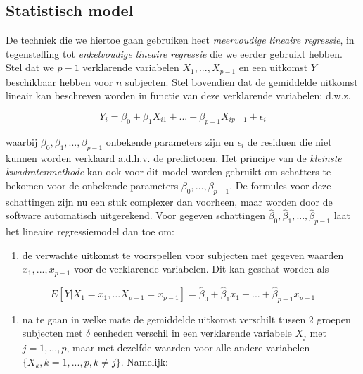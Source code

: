 \documentclass[
  12pt,dutch,coursenotes]{book}
\providecommand{\tightlist}{%
  \setlength{\itemsep}{0pt}\setlength{\parskip}{0pt}}
\begin{document}
\hypertarget{statistisch-model}{%
\subsection{Statistisch model}\label{statistisch-model}}

De techniek die we hiertoe gaan gebruiken heet \emph{meervoudige lineaire regressie}, in tegenstelling tot \emph{enkelvoudige lineaire regressie} die we eerder gebruikt hebben.
Stel dat we \(p-1\) verklarende variabelen \(X_1,...,X_{p-1}\) en een uitkomst \(Y\) beschikbaar hebben voor \(n\)
subjecten.
Stel bovendien dat de gemiddelde uitkomst lineair kan beschreven worden in functie van deze verklarende variabelen; d.w.z.

\[
Y_i =\beta_0 + \beta_1 X_{i1} + ... +\beta_{p-1} X_{ip-1} + \epsilon_i
\]

waarbij \(\beta_0,\beta_1,...,\beta_{p-1}\) onbekende parameters zijn en \(\epsilon_i\) de residuen die niet kunnen worden verklaard a.d.h.v. de predictoren.
Het principe van de \emph{kleinste kwadratenmethode} kan ook voor dit model worden gebruikt om schatters te bekomen voor de onbekende parameters
\(\beta_0, \ldots, \beta_{p-1}\).
De formules voor deze schattingen zijn nu een stuk complexer dan voorheen, maar worden door de software automatisch uitgerekend.
Voor gegeven
schattingen \(\hat{\beta}_0,\hat{\beta}_1,...,\hat{\beta}_{p-1}\) laat het lineaire
regressiemodel dan toe om:

\begin{enumerate}
\def\labelenumi{\arabic{enumi}.}
\tightlist
\item
  de verwachte uitkomst te voorspellen voor subjecten met gegeven
  waarden \(x_1,...,x_{p-1}\) voor de verklarende variabelen.
  Dit kan geschat worden als
\end{enumerate}

\[
E[Y\vert X_1=x_1, \ldots X_{p-1}=x_{p-1}]=\hat{\beta}_0+\hat{\beta}_1x_1+...+\hat{\beta}_{p-1}x_{p-1}
\]

\begin{enumerate}
\def\labelenumi{\arabic{enumi}.}
\setcounter{enumi}{1}
\tightlist
\item
  na te gaan in welke mate de gemiddelde uitkomst verschilt tussen 2 groepen subjecten met \(\delta\) eenheden verschil in een verklarende variabele \(X_j\) met \(j=1,\ldots,p\), maar met dezelfde waarden voor alle andere variabelen \(\{X_k,k=1,...,p,k\ne j\}\).
  Namelijk:
\end{enumerate}
\end{document}
